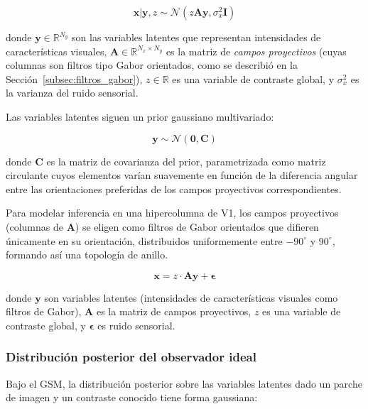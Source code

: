 \begin{equation}
\mathbf{x} | \mathbf{y}, z \sim \mathcal{N}(z \mathbf{A} \mathbf{y}, \sigma_x^2 \mathbf{I})
\label{eq:gsm_likelihood}
\end{equation}

donde $\mathbf{y} \in \mathbb{R}^{N_y}$ son las variables latentes que representan intensidades de características visuales, $\mathbf{A} \in \mathbb{R}^{N_x \times N_y}$ es la matriz de \textit{campos proyectivos} (cuyas columnas son filtros tipo Gabor orientados, como se describió en la Sección~\ref{subsec:filtros_gabor}), $z \in \mathbb{R}$ es una variable de contraste global, y $\sigma_x^2$ es la varianza del ruido sensorial.

Las variables latentes siguen un prior gaussiano multivariado:

\begin{equation}
\mathbf{y} \sim \mathcal{N}(\mathbf{0}, \mathbf{C})
\label{eq:gsm_prior}
\end{equation}

donde $\mathbf{C}$ es la matriz de covarianza del prior, parametrizada como matriz circulante cuyos elementos varían suavemente en función de la diferencia angular entre las orientaciones preferidas de los campos proyectivos correspondientes.

Para modelar inferencia en una hipercolumna de V1, los campos proyectivos (columnas de $\mathbf{A}$) se eligen como filtros de Gabor orientados que difieren únicamente en su orientación, distribuidos uniformemente entre $-90^\circ$ y $90^\circ$, formando así una topología de anillo.

\begin{equation}
\mathbf{x} = z \cdot \mathbf{A}\mathbf{y} + \boldsymbol{\epsilon}
\label{eq:gsm}
\end{equation}

donde $\mathbf{y}$ son variables latentes (intensidades de características visuales como filtros de Gabor), $\mathbf{A}$ es la matriz de campos proyectivos, $z$ es una variable de contraste global, y $\boldsymbol{\epsilon}$ es ruido sensorial.

\subsubsection{Distribución posterior del observador ideal}

Bajo el \acrshort{GSM}, la distribución posterior sobre las variables latentes dado un parche de imagen y un contraste conocido tiene forma gaussiana:

